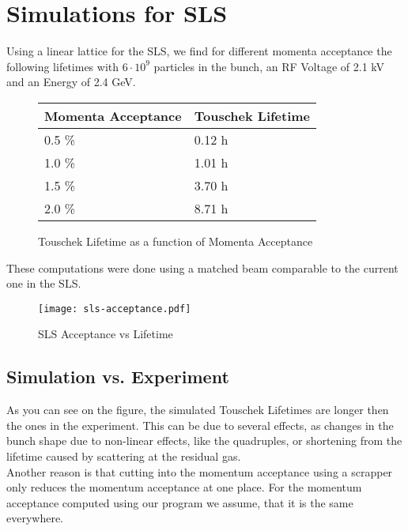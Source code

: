 \section{Simulations for SLS}
Using a linear lattice for the SLS, we find for different momenta acceptance the following lifetimes with $6 \cdot 10^9$ particles in the bunch, an RF Voltage of 2.1 kV and an Energy of 2.4 GeV.
\begin{figure}[here]
\centering
\begin{tabular}{l|l}
Momenta Acceptance & Touschek Lifetime \\ \hline
0.5 \% & 0.12 h \\
1.0 \% & 1.01 h \\
1.5 \% & 3.70 h \\
2.0 \% & 8.71 h 
\end{tabular}
\caption{Touschek Lifetime as a function of Momenta Acceptance}
\end{figure}
These computations were done using a matched beam comparable to the current one in the SLS.
\begin{figure}[here]
 \centering
   \texttt{[image: sls-acceptance.pdf]}
 \caption{SLS Acceptance vs Lifetime}
\end{figure}
\subsection{Simulation vs. Experiment}
As you can see on the figure, the simulated Touschek Lifetimes are longer then the ones in the experiment. This can be due to several effects, as changes in the bunch shape due to non-linear effects, like the quadruples, or shortening from the lifetime caused by scattering at the residual gas.\\
Another reason is that cutting into the momentum acceptance using a scrapper only reduces the momentum acceptance at one place. For the momentum acceptance computed using our program we assume, that it is the same everywhere.
